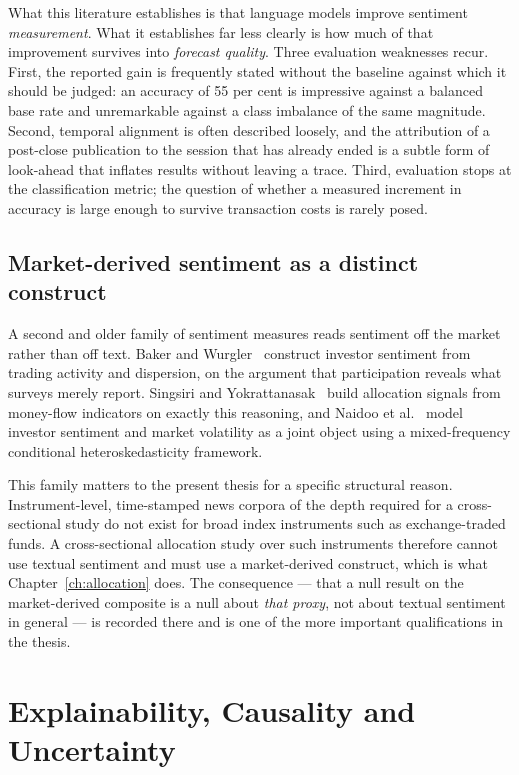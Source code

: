 What this literature establishes is that language models improve sentiment
\emph{measurement}. What it establishes far less clearly is how much of that improvement
survives into \emph{forecast quality}. Three evaluation weaknesses recur. First, the reported
gain is frequently stated without the baseline against which it should be judged: an accuracy
of 55 per cent is impressive against a balanced base rate and unremarkable against a class
imbalance of the same magnitude. Second, temporal alignment is often described loosely, and the
attribution of a post-close publication to the session that has already ended is a subtle form
of look-ahead that inflates results without leaving a trace. Third, evaluation stops at the
classification metric; the question of whether a measured increment in accuracy is large enough
to survive transaction costs is rarely posed.

\subsection{Market-derived sentiment as a distinct construct}

A second and older family of sentiment measures reads sentiment off the market rather than off
text. Baker and Wurgler~\cite{bakerwurgler2007} construct investor sentiment from trading
activity and dispersion, on the argument that participation reveals what surveys merely report.
Singsiri and Yokrattanasak~\cite{singsiri2026} build allocation signals from money-flow
indicators on exactly this reasoning, and Naidoo et al.~\cite{naidoo2025} model investor
sentiment and market volatility as a joint object using a mixed-frequency conditional
heteroskedasticity framework.

This family matters to the present thesis for a specific structural reason. Instrument-level,
time-stamped news corpora of the depth required for a cross-sectional study do not exist for
broad index instruments such as exchange-traded funds. A cross-sectional allocation study over
such instruments therefore cannot use textual sentiment and must use a market-derived
construct, which is what Chapter~\ref{ch:allocation} does. The consequence --- that a null
result on the market-derived composite is a null about \emph{that proxy}, not about textual
sentiment in general --- is recorded there and is one of the more important qualifications in
the thesis.

\section{Explainability, Causality and Uncertainty}

